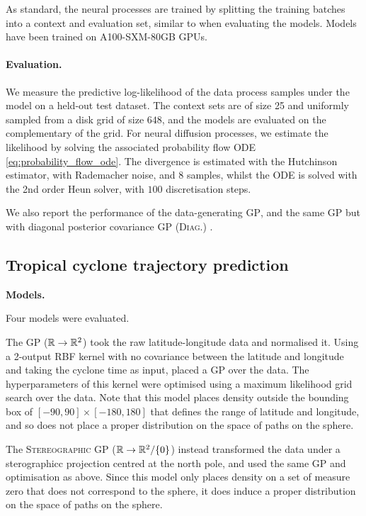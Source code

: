 As standard, the neural processes are trained by splitting the training batches into a context and evaluation set, similar to when evaluating the models.
Models have been trained on A100-SXM-80GB GPUs.

\paragraph{Evaluation.}
We measure the predictive log-likelihood of the data process samples under the model on a held-out test dataset.
The context sets are of size 25 and uniformly sampled from a disk grid of size $648$, and the models are evaluated on the complementary of the grid.
For neural diffusion processes, we estimate the likelihood by solving the associated probability flow ODE \eqref{eq:probability_flow_ode}.
The divergence is estimated with the Hutchinson estimator, with Rademacher noise, and 8 samples, whilst the ODE is solved with the 2nd order Heun solver, with $100$ discretisation steps.

We also report the performance of the data-generating {\scshape GP}, and the same GP but with diagonal posterior covariance {\scshape GP (Diag.)
	}.

\subsection{Tropical cyclone trajectory prediction}
\label{sec:cyclonedetail}

\textbf{Models. }

Four models were evaluated.

The \textsc{GP ($\mathbb{R}\to\mathbb{R}^2$)} took the raw latitude-longitude data and normalised it.
Using a 2-output RBF kernel with no covariance between the latitude and longitude and taking the cyclone time as input, placed a GP over the data.
The hyperparameters of this kernel were optimised using a maximum likelihood grid search over the data.
Note that this model places density outside the bounding box of $[-90, 90] \times [-180, 180]$ that defines the range of latitude and longitude, and so does not place a proper distribution on the space of paths on the sphere.

The \textsc{Stereographic GP ($\mathbb{R} \to \mathbb{R}^2/\{0\}$)} instead transformed the data under a sterographicc projection centred at the north pole, and used the same GP and optimisation as above.
Since this model only places density on a set of measure zero that does not correspond to the sphere, it does induce a proper distribution on the space of paths on the sphere.

